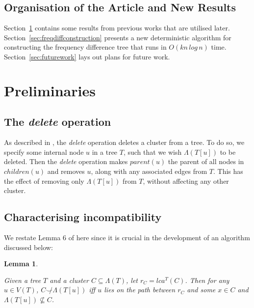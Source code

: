 \documentclass{article}
\newcommand{\compatible}{\smile}
\newcommand{\leafset}{\Lambda}
\newtheorem{incompatibility}{Lemma}
\begin{document}
    \subsection{Organisation of the Article and New Results}
    Section~\ref{sec:preliminaries} contains some results from previous works that are utilised later. Section~\ref{sec:freqdiffconstruction} presents a new deterministic algorithm for constructing the frequency difference tree that runs in $O(kn\,log\,n)$ time. Section~\ref{sec:futurework} lays out plans for future work.

    \section{Preliminaries}
    \label{sec:preliminaries}

    \subsection{The \textit{delete} operation}
    As described in \cite{jansson2018algorithms}, the \textit{delete} operation deletes a cluster from a tree. To do so, we specify some internal node $u$ in a tree $T$, such that we wish $\leafset(T[u])$ to be deleted. Then the \textit{delete} operation makes $parent(u)$ the parent of all nodes in $children(u)$ and removes $u$, along with any associated edges from $T$. This has the effect of removing only $\leafset(T[u])$ from $T$, without affecting any other cluster.

    \subsection{Characterising incompatibility}
    We restate Lemma 6 of \cite{jansson2018algorithms} here since it is crucial in the development of an algorithm discussed below:

    \begin{incompatibility}
        \label{lem:incompatibility}

        Given a tree $T$ and a cluster $C \subseteq \leafset(T)$, let $r_C = lca^T(C)$. Then for any $u \in V(T)$, $C \not\compatible \leafset(T[u])$ iff $u$ lies on the path between $r_C$ and some $x \in C$ and $\leafset(T[u]) \not\subseteq C$.
    \end{incompatibility}
\end{document}
